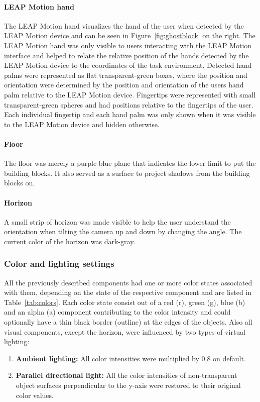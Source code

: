 \paragraph{LEAP Motion hand}
The LEAP Motion hand visualizes the hand of the user when detected by the LEAP Motion device and can be seen in Figure~\ref{fig:ghostblock} on the right. The LEAP Motion hand was only visible to users interacting with the LEAP Motion interface and helped to relate the relative position of the hands detected by the LEAP Motion device to the coordinates of the task environment. Detected hand palms were represented as flat transparent-green boxes, where the position and orientation were determined by the position and orientation of the users hand palm relative to the LEAP Motion device. Fingertips were represented with small transparent-green spheres and had positions relative to the fingertips of the user. Each individual fingertip and each hand palm was only shown when it was visible to the LEAP Motion device and hidden otherwise.

\paragraph{Floor}
The floor was merely a purple-blue plane that indicates the lower limit to put the building blocks. It also served as a surface to project shadows from the building blocks on.

\paragraph{Horizon}
A small strip of horizon was made visible to help the user understand the orientation when tilting the camera up and down by changing the angle. The current color of the horizon was dark-gray.

\subsubsection{Color and lighting settings}

All the previously described components had one or more color states associated with them, depending on the state of the respective component and are listed in Table~\ref{tab:colors}. Each  color state consist out of a red (r), green (g), blue (b) and an alpha (a) component contributing to the color intensity and could optionally have a thin black border (outline) at the edges of the objects. Also all visual components, except the horizon, were influenced by two types of virtual lighting: 
\begin{enumerate}
	\item{\textbf{Ambient lighting:}} All color intensities were multiplied by $0.8$ on default.
	\item{\textbf{Parallel directional light:}} All the color intensities of non-transparent object surfaces perpendicular to the y-axis were restored to their original color values.
\end{enumerate}


